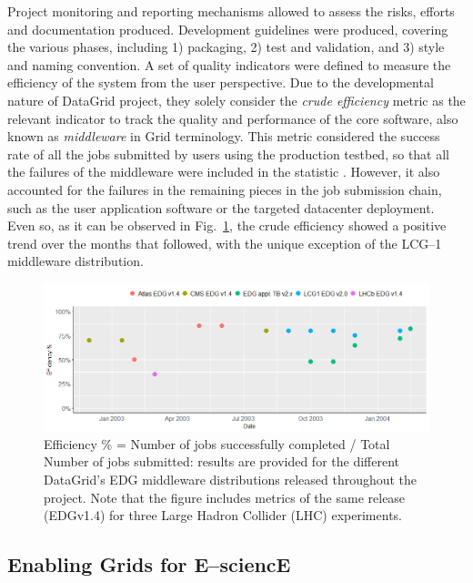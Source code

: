 Project monitoring and reporting mechanisms allowed to assess the risks, efforts and documentation
produced. Development guidelines \cite{datagridguide} were produced, covering the various phases, including
1) packaging, 2) test and validation, and 3) style and naming convention. A set of quality indicators
\cite{datagridindicators} were defined to measure the efficiency of the system from the user perspective. 
Due to the developmental nature of DataGrid project, they solely consider the \textit{crude efficiency} 
metric as the relevant indicator to track the quality and performance of the core software, also known as
\emph{middleware}
in Grid terminology. This metric considered the success rate of all the jobs submitted by users using the 
production testbed, so that all the failures of the middleware were included in the statistic \cite{avellino2004datagrid}. However, it
also accounted for the failures in the remaining pieces in the job submission chain, such as the user application 
software or the targeted datacenter deployment. Even so, as it can be observed in Fig.~\ref{fig:efficiency}, 
the crude efficiency showed a positive trend over the months that followed, with the unique exception of the 
LCG--1 middleware distribution.
\begin{figure}[h]
\centering
\includegraphics[width=1\textwidth]{images/datagridEff.png}
\caption{Efficiency \% = Number of jobs successfully completed / Total Number of jobs submitted: results are 
provided for the different DataGrid's EDG middleware distributions released throughout the project. Note that the figure
includes metrics of the same release (EDGv1.4) for three Large Hadron Collider (LHC) experiments.}
\label{fig:efficiency}
\end{figure}

\subsection{Enabling Grids for E--sciencE}

